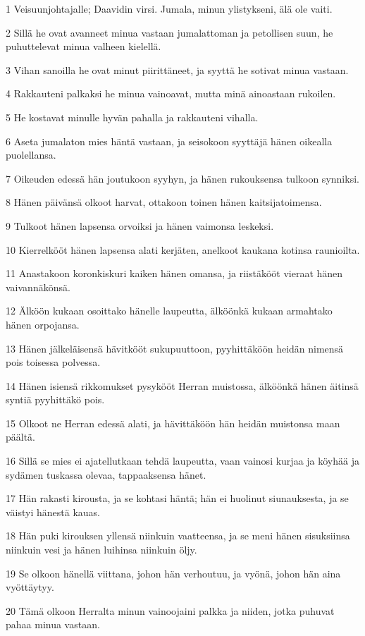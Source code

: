 \par 1 Veisuunjohtajalle; Daavidin virsi. Jumala, minun ylistykseni, älä ole vaiti.
\par 2 Sillä he ovat avanneet minua vastaan jumalattoman ja petollisen suun, he puhuttelevat minua valheen kielellä.
\par 3 Vihan sanoilla he ovat minut piirittäneet, ja syyttä he sotivat minua vastaan.
\par 4 Rakkauteni palkaksi he minua vainoavat, mutta minä ainoastaan rukoilen.
\par 5 He kostavat minulle hyvän pahalla ja rakkauteni vihalla.
\par 6 Aseta jumalaton mies häntä vastaan, ja seisokoon syyttäjä hänen oikealla puolellansa.
\par 7 Oikeuden edessä hän joutukoon syyhyn, ja hänen rukouksensa tulkoon synniksi.
\par 8 Hänen päivänsä olkoot harvat, ottakoon toinen hänen kaitsijatoimensa.
\par 9 Tulkoot hänen lapsensa orvoiksi ja hänen vaimonsa leskeksi.
\par 10 Kierrelkööt hänen lapsensa alati kerjäten, anelkoot kaukana kotinsa raunioilta.
\par 11 Anastakoon koronkiskuri kaiken hänen omansa, ja riistäkööt vieraat hänen vaivannäkönsä.
\par 12 Älköön kukaan osoittako hänelle laupeutta, älköönkä kukaan armahtako hänen orpojansa.
\par 13 Hänen jälkeläisensä hävitkööt sukupuuttoon, pyyhittäköön heidän nimensä pois toisessa polvessa.
\par 14 Hänen isiensä rikkomukset pysykööt Herran muistossa, älköönkä hänen äitinsä syntiä pyyhittäkö pois.
\par 15 Olkoot ne Herran edessä alati, ja hävittäköön hän heidän muistonsa maan päältä.
\par 16 Sillä se mies ei ajatellutkaan tehdä laupeutta, vaan vainosi kurjaa ja köyhää ja sydämen tuskassa olevaa, tappaaksensa hänet.
\par 17 Hän rakasti kirousta, ja se kohtasi häntä; hän ei huolinut siunauksesta, ja se väistyi hänestä kauas.
\par 18 Hän puki kirouksen yllensä niinkuin vaatteensa, ja se meni hänen sisuksiinsa niinkuin vesi ja hänen luihinsa niinkuin öljy.
\par 19 Se olkoon hänellä viittana, johon hän verhoutuu, ja vyönä, johon hän aina vyöttäytyy.
\par 20 Tämä olkoon Herralta minun vainoojaini palkka ja niiden, jotka puhuvat pahaa minua vastaan.
